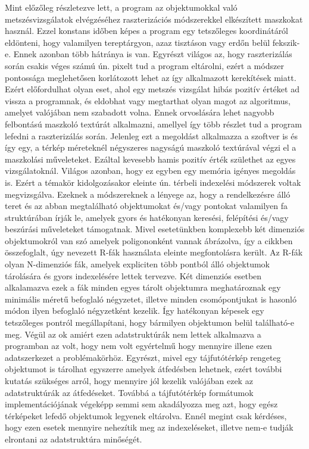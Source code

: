 Mint előzőleg részletezve lett, a program az objektumokkal való metszésvizsgálatok elvégzéséhez raszterizációs módszerekkel elkészített maszkokat használ. Ezzel konstans időben képes a program egy tetszőleges koordinátáról eldönteni, hogy valamilyen tereptárgyon, azaz tisztáson vagy erdőn belül fekszik-e. \newline Ennek azonban több hátránya is van. Egyrészt világos az, hogy raszterizálás során csakis véges számú ún. pixelt tud a program eltárolni, ezért a módszer pontossága meglehetősen korlátozott lehet az így alkalmazott kerekítések miatt. Ezért előfordulhat olyan eset, ahol egy metszés vizsgálat hibás pozitív értéket ad vissza a programnak, és eldobhat vagy megtarthat olyan magot az algoritmus, amelyet valójában nem szabadott volna.\newline
Ennek orvoslására lehet nagyobb felbontású maszkoló textúrát alkalmazni, amellyel így több részlet tud a program lefedni a raszterizálás során. Jelenleg ezt a megoldást alkalmazza a szoftver is és így egy, a térkép méreteknél négyszeres nagyságú maszkoló textúrával végzi el a maszkolási műveleteket. Ezáltal kevesebb hamis pozitív érték születhet az egyes vizsgálatoknál.\newline
Világos azonban, hogy ez egyben egy memória igényes megoldás is. Ezért a témakör kidolgozásakor eleinte ún. térbeli indexelési módszerek voltak megvizsgálva. Ezeknek a módszereknek a lényege az, hogy a rendelkezésre álló teret és az abban megtalálható objektumokat és/vagy pontokat valamilyen fa struktúrában írják le, amelyek gyors és hatékonyan keresési, felépítési és/vagy beszúrási műveleteket támogatnak. Mivel esetetünkben komplexebb két dimenziós objektumokról van szó amelyek poligononként vannak ábrázolva, így a \cite{10.1145/602259.602266} cikkben összefoglalt, úgy nevezett R-fák használata eleinte megfontolásra került. Az R-fák olyan N-dimenziós fák, amelyek expliciten több pontból álló objektumok tárolására és gyors indexelésére lettek tervezve. Két dimenziós esetben alkalamazva ezek a fák minden egyes tárolt objektumra meghatároznak egy minimális méretű befoglaló négyzetet, illetve minden csomópontjukat is hasonló módon ilyen befoglaló négyzetként kezelik. Így hatékonyan képesek egy tetszőleges pontról megállapítani, hogy bármilyen objektumon belül található-e meg.\newline
Végül az ok amiért ezen adatstruktúrák nem lettek alkalmazva a programban az volt, hogy nem volt egyértelmű hogy mennyire illene ezen adatszerkezet a problémakörhöz. Egyrészt, mivel egy tájfutótérkép rengeteg objektumot is tárolhat egyszerre amelyek átfedésben lehetnek, ezért további kutatás szükséges arról, hogy mennyire jól kezelik valójában ezek az adatstruktúrák az átfedéseket. Továbbá a tájfutótérkép formátumok implementációjának végeképp semmi sem akadályozza meg azt, hogy egész térképeket lefedő objektumok legyenek eltárolva. Ennél megint csak kérdéses, hogy ezen esetek mennyire nehezítik meg az indexeléseket, illetve nem-e tudják elrontani az adatstruktúra minőségét.
\pagebreak
